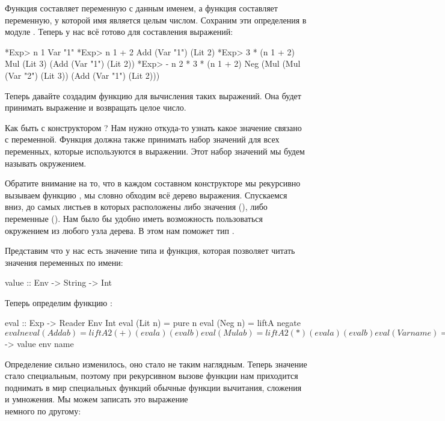 Функция  составляет переменную с данным именем, а функция 
составляет переменную, у которой имя является целым числом. Сохраним эти
определения в модуле . Теперь у нас всё готово для составления
выражений:


\begin{code}
*Exp> n 1
Var "1"
*Exp> n 1 + 2
Add (Var "1") (Lit 2)
*Exp> 3 * (n 1 + 2)
Mul (Lit 3) (Add (Var "1") (Lit 2))
*Exp> - n 2 * 3 * (n 1 + 2)
Neg (Mul (Mul (Var "2") (Lit 3)) (Add (Var "1") (Lit 2)))
\end{code}

Теперь давайте создадим функцию для вычисления таких выражений. Она
будет принимать выражение и возвращать целое число.



Как быть с конструктором ? Нам нужно откуда-то узнать какое
значение связано с переменной. Функция  должна также принимать
набор значений для всех переменных, которые используются в выражении.
Этот набор значений мы будем называть окружением.

Обратите внимание на то, что в каждом составном конструкторе мы
рекурсивно вызываем функцию , мы словно обходим всё дерево
выражения. Спускаемся вниз, до самых листьев в которых расположены либо
значения (), либо переменные (). Нам было бы удобно
иметь возможность пользоваться окружением из любого узла дерева. В этом
нам поможет тип .

Представим что у нас есть значение типа  и функция, которая
позволяет читать значения переменных по имени:


\begin{code}
value :: Env -> String -> Int
\end{code}

Теперь определим функцию :


\begin{code}
eval :: Exp -> Reader Env Int
eval (Lit n)    = pure n
eval (Neg n)    = liftA  negate $ eval n
eval (Add a b)  = liftA2 (+) (eval a) (eval b)
eval (Mul a b)  = liftA2 (*) (eval a) (eval b)
eval (Var name) = Reader $ \env -> value env name 
\end{code}

Определение сильно изменилось, оно стало не таким наглядным. Теперь
значение  стало специальным, поэтому при рекурсивном вызове
функции  нам приходится поднимать в мир специальных функций
обычные функции вычитания, сложения и умножения. Мы можем записать это
выражение\\немного по другому:



